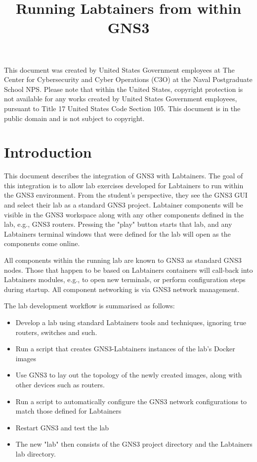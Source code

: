 \documentclass[12pt]{article}
\begin{document}
\begin{titlepage}
\title {Running Labtainers from within GNS3}
\maketitle

\vspace{2.0in}
This document was created by United States Government employees at 
The Center for Cybersecurity and Cyber Operations (C3O) at the Naval Postgraduate School NPS. 
Please note that within the United States, copyright protection is not available for any works created  
by United States Government employees, pursuant to Title 17 United States Code Section 105.   
This document is in the public domain and is not subject to copyright. 
\end{titlepage}
\tableofcontents
\newpage
\section {Introduction}
This document describes the integration of GNS3 with Labtainers.
The goal of this integration is to allow lab exercises developed for Labtainers to run within the
GNS3 environment.   From the student's perspective, they see the GNS3 GUI and select their lab as a standard GNS3 project.
Labtainer components will be visible in the GNS3 workspace along with any other components defined in the lab, 
e.g., GNS3 routers.  Pressing the "play" button starts that lab, and any Labtainers terminal windows that were
defined for the lab will open as the components come online.

All components within the running lab are known to GNS3 as standard GNS3 nodes.  Those that happen to be based on
Labtainers containers will call-back into Labtainers modules, e.g., to open new terminals, or perform configuration steps
during startup.  All component networking is via GNS3 network management.

The lab development workflow is summarised as follows:
\begin{itemize}
	\item Develop a lab using standard Labtainers tools and techniques, ignoring true routers, switches and such.
	\item Run a script that creates GNS3-Labtainers instances of the lab's Docker images
	\item Use GNS3 to lay out the topology of the newly created images, along with other devices such as routers.
	\item Run a script to automatically configure the GNS3 network configurations to match those defined for Labtainers
	\item Restart GNS3 and test the lab
	\item The new "lab" then consists of the GNS3 project directory and the Labtainers lab directory.
\end{itemize}
\end{document}
